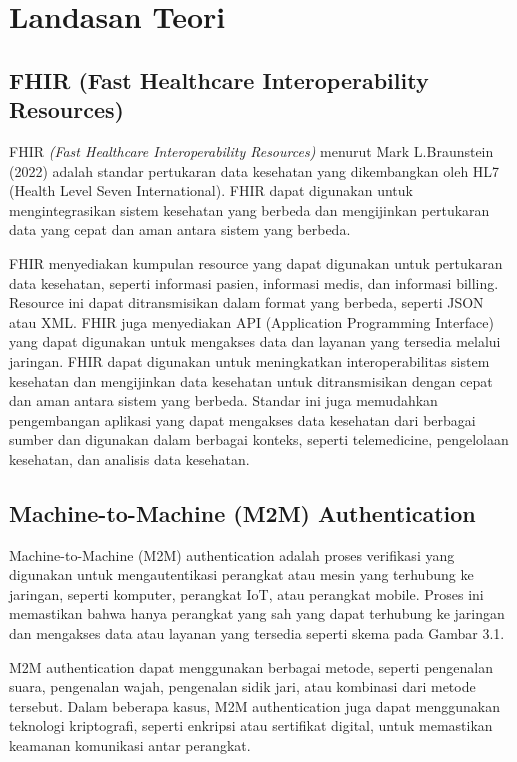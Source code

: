 \chapter{Landasan Teori}

\section{FHIR (Fast Healthcare Interoperability Resources)}
FHIR \textit{(Fast Healthcare Interoperability Resources)} menurut Mark L.Braunstein (2022) adalah standar pertukaran data kesehatan yang dikembangkan oleh HL7 (Health Level Seven International). FHIR dapat digunakan untuk mengintegrasikan sistem kesehatan yang berbeda dan mengijinkan pertukaran data yang cepat dan aman antara sistem yang berbeda.

FHIR menyediakan kumpulan resource yang dapat digunakan untuk pertukaran data kesehatan, seperti informasi pasien, informasi medis, dan informasi billing. Resource ini dapat ditransmisikan dalam format yang berbeda, seperti JSON atau XML. FHIR juga menyediakan API (Application Programming Interface) yang dapat digunakan untuk mengakses data dan layanan yang tersedia melalui jaringan.
FHIR dapat digunakan untuk meningkatkan interoperabilitas sistem kesehatan dan mengijinkan data kesehatan untuk ditransmisikan dengan cepat dan aman antara sistem yang berbeda. Standar ini juga memudahkan pengembangan aplikasi yang dapat mengakses data kesehatan dari berbagai sumber dan digunakan dalam berbagai konteks, seperti telemedicine, pengelolaan kesehatan, dan analisis data kesehatan.


\section{Machine-to-Machine (M2M) Authentication}
Machine-to-Machine (M2M) authentication adalah proses verifikasi yang digunakan untuk mengautentikasi perangkat atau mesin yang terhubung ke jaringan, seperti komputer, perangkat IoT, atau perangkat mobile. Proses ini memastikan bahwa hanya perangkat yang sah yang dapat terhubung ke jaringan dan mengakses data atau layanan yang tersedia seperti skema pada Gambar 3.1.

M2M authentication dapat menggunakan berbagai metode, seperti pengenalan suara, pengenalan wajah, pengenalan sidik jari, atau kombinasi dari metode tersebut. Dalam beberapa kasus, M2M authentication juga dapat menggunakan teknologi kriptografi, seperti enkripsi atau sertifikat digital, untuk memastikan keamanan komunikasi antar perangkat.

